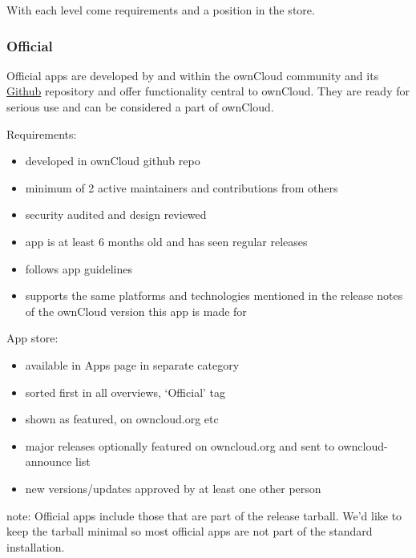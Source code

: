 \documentclass[letterpaper,10pt,english]{sphinxmanual}
\begin{document}
With each level come requirements and a position in the store.


\subsubsection{Official}
\label{app/publishing:official}
Official apps are developed by and within the ownCloud community and its \href{https://github.com/owncloud}{Github} repository and offer functionality central to ownCloud. They are ready for serious use and can be considered a part of ownCloud.

Requirements:
\begin{itemize}
\item {} 
developed in ownCloud github repo

\item {} 
minimum of 2 active maintainers and contributions from others

\item {} 
security audited and design reviewed

\item {} 
app is at least 6 months old and has seen regular releases

\item {} 
follows app guidelines

\item {} 
supports the same platforms and technologies mentioned in the release notes of the ownCloud version this app is made for

\end{itemize}

App store:
\begin{itemize}
\item {} 
available in Apps page in separate category

\item {} 
sorted first in all overviews, `Official' tag

\item {} 
shown as featured, on owncloud.org etc

\item {} 
major releases optionally featured on owncloud.org and sent to owncloud-announce list

\item {} 
new versions/updates approved by at least one other person

\end{itemize}

note:
Official apps include those that are part of the release tarball. We'd like to keep the tarball minimal so most official apps are not part of the standard installation.
\end{document}
